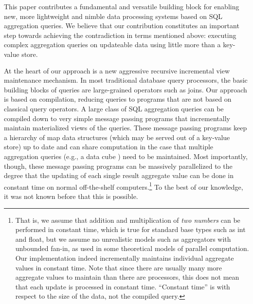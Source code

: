 This paper contributes a fundamental and versatile building block for
enabling new, more lightweight and nimble data processing systems based
on SQL aggregation que\-ries. We believe that our contribution
constitutes an important
step towards achieving the contradiction in terms mentioned
above: executing complex aggregation queries on updateable data
using little more than a key-value store.

At the heart of our approach is a new aggressive recursive incremental
view maintenance mechanism.
In most traditional database query processors, the  basic building blocks of
queries are large-grained operators such as joins.
Our approach is based on compilation, reducing
queries to programs that are not based on classical query operators.
A large class of
SQL aggregation queries can be compiled down to very simple message
passing programs that incrementally maintain materialized views of
the queries. These message passing programs keep a hierarchy of map data
structures (which may be served out of a key-value store) up to date
and can share computation in the case that multiple aggregation queries (e.g.,
a data cube \cite{datacube}) need to be maintained.  Most importantly, though, these message
passing programs can be massively parallelized to the degree that the updating
of each single result aggregate value can be done in constant time on normal
off-the-shelf computers.\footnote{That is,
we assume that addition and multiplication
of {\em two numbers} can be performed in constant time, which is true for
%
%
standard base types such as int and float,
but we assume no unrealistic models such
as aggregators with unbounded fan-in, as used in some theoretical models of
parallel computation. Our implementation indeed incrementally maintains
individual aggregate values in constant time. Note that since there are
usually many more aggregate values to maintain than there are processors,
this does not mean that each update is processed in constant time.
``Constant time'' is with respect to the size of the data, not the compiled
query.}
To the best of our knowledge, it was not known before
that this is possible.

